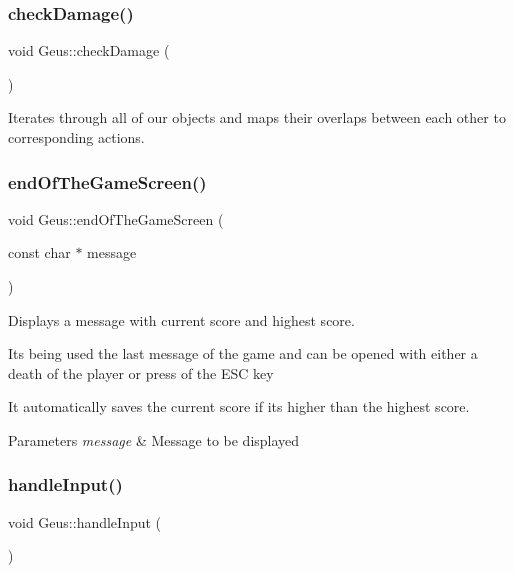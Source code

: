 \subsubsection{\texorpdfstring{check\+Damage()}{checkDamage()}}
{\footnotesize\ttfamily void Geus\+::check\+Damage (\begin{DoxyParamCaption}{ }\end{DoxyParamCaption})\hspace{0.3cm}{\ttfamily [private]}}



Iterates through all of our objects and maps their overlaps between each other to corresponding actions. 

\mbox{\label{classGeus_a1325fd4454fd45be398e140b3bcc1120}} 
\subsubsection{\texorpdfstring{end\+Of\+The\+Game\+Screen()}{endOfTheGameScreen()}}
{\footnotesize\ttfamily void Geus\+::end\+Of\+The\+Game\+Screen (\begin{DoxyParamCaption}\item[{const char $\ast$}]{message }\end{DoxyParamCaption})\hspace{0.3cm}{\ttfamily [private]}}

Displays a message with current score and highest score.

It\textquotesingle{}s being used the last message of the game and can be opened with either a death of the player or press of the E\+SC key

It automatically saves the current score if it\textquotesingle{}s higher than the highest score.


\begin{DoxyParams}{Parameters}
{\em message} & Message to be displayed \\
\hline
\end{DoxyParams}
\mbox{\label{classGeus_ac562cba645d11b3ead596a40f2138ae8}} 
\subsubsection{\texorpdfstring{handle\+Input()}{handleInput()}}
{\footnotesize\ttfamily void Geus\+::handle\+Input (\begin{DoxyParamCaption}{ }\end{DoxyParamCaption})\hspace{0.3cm}{\ttfamily [private]}}



